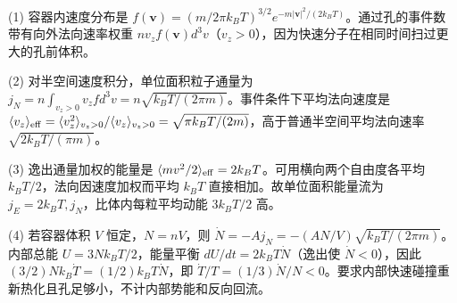 (1) 容器内速度分布是 \(f(\mathbf v)=(m/2\pi k_BT)^{3/2}e^{-m|\mathbf v|^2/(2k_BT)}\)。通过孔的事件数带有向外法向速率权重 \(nv_zf(\mathbf v)d^3v\)（\(v_z>0\)），因为快速分子在相同时间扫过更大的孔前体积。

(2) 对半空间速度积分，单位面积粒子通量为 \(\boxed{j_N=n\int_{v_z>0}v_zf d^3v=n\sqrt{k_BT/(2\pi m)}}\)。事件条件下平均法向速度是 \(\langle v_z\rangle_{\rm eff}=\langle v_z^2\rangle_{v_z>0}/\langle v_z\rangle_{v_z>0}=\sqrt{\pi k_BT/(2m)}\)，高于普通半空间平均法向速率 \(\sqrt{2k_BT/(\pi m)}\)。

(3) 逸出通量加权的能量是 \(\langle mv^2/2\rangle_{\rm eff}=2k_BT\)。可用横向两个自由度各平均 \(k_BT/2\)，法向因速度加权而平均 \(k_BT\) 直接相加。故单位面积能量流为 \(\boxed{j_E=2k_BT,j_N}\)，比体内每粒平均动能 \(3k_BT/2\) 高。

(4) 若容器体积 \(V\) 恒定，\(N=nV\)，则 \(\dot N=-Aj_N=-(AN/V)\sqrt{k_BT/(2\pi m)}\)。内部总能 \(U=3Nk_BT/2\)，能量平衡 \(dU/dt=2k_BT\dot N\)（逸出使 \(\dot N<0\)），因此 \(\boxed{(3/2)Nk_B\dot T=(1/2)k_BT\dot N}\)，即 \(\dot T/T=(1/3)\dot N/N<0\)。要求内部快速碰撞重新热化且孔足够小，不计内部势能和反向回流。
